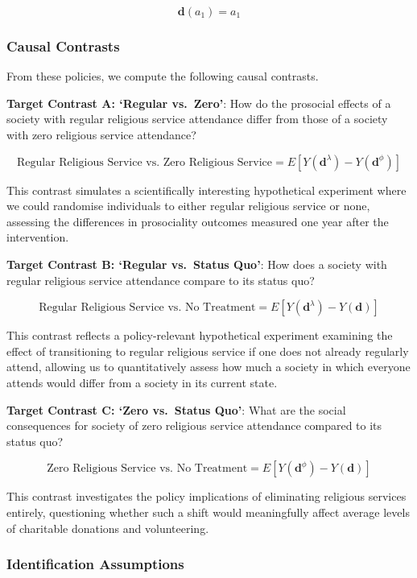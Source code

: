 \documentclass[
  single column]{article}
\begin{document}
\[
\mathbf{d}(a_1) = a_1
\]

\subsubsection{Causal Contrasts}\label{causal-contrasts}

From these policies, we compute the following causal contrasts.

\textbf{Target Contrast A: `Regular vs.~Zero'}: How do the prosocial
effects of a society with regular religious service attendance differ
from those of a society with zero religious service attendance?

\[ \text{Regular Religious Service vs. Zero Religious Service} = E[Y(\mathbf{d}^\lambda) - Y(\mathbf{d}^\phi)] \]

This contrast simulates a scientifically interesting hypothetical
experiment where we could randomise individuals to either regular
religious service or none, assessing the differences in prosociality
outcomes measured one year after the intervention.

\textbf{Target Contrast B: `Regular vs.~Status Quo'}: How does a society
with regular religious service attendance compare to its status quo?

\[ \text{Regular Religious Service vs. No Treatment} = E[Y(\mathbf{d}^\lambda) - Y(\mathbf{d})] \]

This contrast reflects a policy-relevant hypothetical experiment
examining the effect of transitioning to regular religious service if
one does not already regularly attend, allowing us to quantitatively
assess how much a society in which everyone attends would differ from a
society in its current state.

\textbf{Target Contrast C: `Zero vs.~Status Quo'}: What are the social
consequences for society of zero religious service attendance compared
to its status quo?

\[ \text{Zero Religious Service vs. No Treatment} = E[Y(\mathbf{d}^\phi) - Y(\mathbf{d})] \]

This contrast investigates the policy implications of eliminating
religious services entirely, questioning whether such a shift would
meaningfully affect average levels of charitable donations and
volunteering.

\subsubsection{Identification
Assumptions}\label{identification-assumptions}
\end{document}

